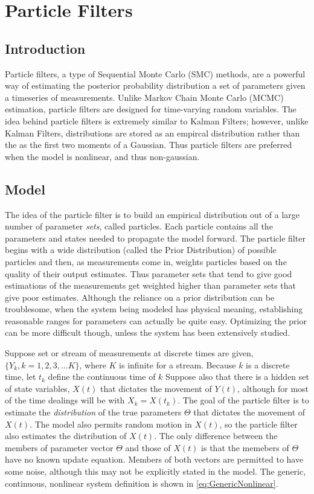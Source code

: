 \chapter{Particle Filters}
\label{sec:Particle Filter}
\section{Introduction}
Particle filters, a type of Sequential Monte Carlo (SMC) methods,
are a powerful way of estimating the posterior probability distribution
a set of parameters given a timeseries of measurements. Unlike Markov 
Chain Monte Carlo (MCMC) estimation, particle filters are designed for 
time-varying random variables. The idea behind particle filters is
extremely similar to Kalman Filters; however, unlike Kalman Filters,
distributions are stored as an empircal distribution rather than the
as the first two moments of a Gaussian. Thus particle filters are 
preferred when the model is nonlinear, and thus non-gaussian.

\section{Model}
\label{sec:Particle Filter Model}
The idea of the particle filter is to build an empirical distribution
out of a large number of parameter \emph{sets}, called particles. Each
particle contains all the parameters and states needed to propagate
the model forward.  The particle filter begins with a wide distribution 
(called the Prior Distribution)
of possible particles and then, as measurements come in, weights 
particles based on the quality of their output estimates. Thus parameter sets 
that tend to give good estimations of the measurements get weighted higher
than parameter sets that give poor estimates. Although the reliance on
a prior distribution can be troublesome, when the system being modeled
has physical meaning, establishing reasonable ranges for parameters can 
actually be quite easy. Optimizing the prior can be more difficult though,
unless the system has been extensively studied.

Suppose set or stream of measurements at discrete times are given, 
$\{Y_k, k = 1, 2, 3, ... K\}$, where $K$ is infinite for a stream. 
Because $k$ is a discrete time, let $t_k$ define the continuous
time of $k$
Suppose also that there is a hidden set of state variables,
$X(t)$ that dictates the movement
of $Y(t)$, although for most of the time dealings will be
with $X_k = X(t_k)$. The goal of the particle filter is to estimate the 
\emph{distribution} of the
true parameters $\Theta$ that dictates the movement of $X(t)$.
The model also permits random motion in $X(t)$, so the 
particle filter also estimates the distribution of $X(t)$.
The only difference between the members of parameter vector
$\Theta$ and those of $X(t)$ is that the memebers of
$\Theta$ have no known update equation. Members of both vectors
are permitted to have some noise, although this
may not be explicitly stated in the model. The generic, continuous, nonlinear
system definition is shown in \autoref{eq:GenericNonlinear}.


